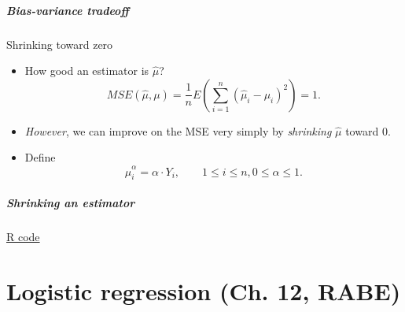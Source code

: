 \documentclass[handout]{beamer}
\begin{document}
   \begin{frame} \frametitle{Bias-variance tradeoff}

   \begin{block}
   {Shrinking toward zero}
   \begin{itemize}

   \item How good an estimator is $\widehat{\mu}$?
   $$
   MSE(\widehat{\mu}, \mu) = \frac{1}{n} E(\sum_{i=1}^n (\widehat{\mu}_i -\mu_i)^2)  = 1.$$
   \item {\em However}, we can improve on the MSE very simply by {\em shrinking}
   $\widehat{\mu}$  toward 0.

   \item Define
   $$
   \widehat{\mu}^{\alpha}_i = \alpha \cdot Y_i, \qquad 1 \leq i \leq n, 0 \leq \alpha \leq 1.$$

   \end{itemize}
   \end{block}
   \end{frame}



   \begin{frame}
   \frametitle{Shrinking an estimator}
   \begin{center}
   \end{center}
   \href{http://stats191.stanford.edu/selection.html#bias-variance-tradeoff}{R code}
   \end{frame}

   \part{Logistic regression (Ch. 12, RABE)}
   \frame{\partpage}

\end{document}
